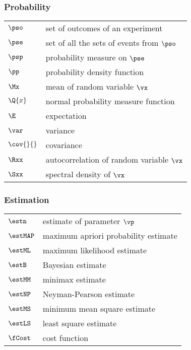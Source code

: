 \subsubsection*{Probability}
\begin{tabular}{ll}
   $\pso$ & set of outcomes of an experiment           \\
   $\pse$ & set of all the sets of events from $\pso$  \\
   $\psp$ & probability measure on $\pse$   \\
   $\pp$  & probability density function \\
   $\Mx$  & mean of random variable $\vx$ \\
   $\Q{x}$ & normal probability measure function \\
   $\E   $ & expectation                 \\
   $\var$  & variance \\
   $\cov{}{}$  & covariance \\
   $\Rxx$ & autocorrelation of random variable $\vx$ \\
   $\Sxx$ & spectral density of $\vx$ \\
\end{tabular}

\subsubsection*{Estimation}
\begin{tabular}{ll}
   $\estn   $ & estimate of parameter $\vp$          \\
   $\estMAP $ & maximum apriori probability estimate \\
   $\estML  $ & maximum likelihood estimate          \\
   $\estB   $ & Bayesian estimate                    \\
   $\estMM  $ & minimax estimate                     \\
   $\estNP  $ & Neyman-Pearson estimate              \\
   $\estMS  $ & minimum mean square estimate         \\
   $\estLS  $ & least square estimate                \\
   $\fCost  $ & cost function                        \\
\end{tabular}

